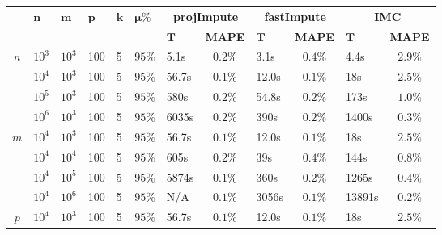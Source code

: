 \documentclass[twoside,11pt]{article}
\begin{document}
\begin{table}[ht!]
\centering
\begin{tabular}{|c|l|l|l|l|l||l|c|l|c|l|c|}
	\hline \multirow{2}{*}{} & \multirow{2}{*}{$\bm{n}$}&\multirow{2}{*}{$\bm{m}$}&\multirow{2}{*}{$\bm{p}$}&\multirow{2}{*}{$\bm{k}$} & \multirow{2}{*}{$\bm{\mu\%}$} & \multicolumn{2}{c|}{\textbf{projImpute}} & \multicolumn{2}{c|}{\textbf{fastImpute}} & \multicolumn{2}{c|}{\textbf{IMC}}\\\cline{7-12}
	&  &  & & & & $\bm{T}$ & \textbf{MAPE} & $\bm{T}$ & \textbf{MAPE}& $\bm{T}$ & \textbf{MAPE}\\\hline
	\multirow{4}{*}{$n$}&$10^3$ & $10^3$ & 100& 5 & $95\%$ & 5.1s &$0.2\%$& 3.1s &$0.4\%$ &4.4s & $2.9\%$ \\
	&$10^4$ & $10^3$& 100& 5 & $95\%$ & 56.7s&$0.1\%$& 12.0s&$0.1\%$ & 18s&$2.5\%$ \\
	&$10^5$ & $10^3$& 100 & 5 & $95\%$ & 580s &$0.2\%$& 54.8s &$0.2\%$ &173s & $1.0\%$\\
	&$10^6$ & $10^3$& 100 & 5 & $95\%$& 6035s &$0.2\%$ & 390s &$0.2\%$ &1400s & $0.3\%$  \\\hline\hline
	\multirow{4}{*}{$m$}	&$10^4$ & $10^3$& 100& 5 & $95\%$ & 56.7s&$0.1\%$& 12.0s&$0.1\%$ & 18s&$2.5\%$ \\

	&$10^4$ & $10^4$& 100& 5 & $95\%$ & 605s&$0.2\%$& 39s&$0.4\%$ & 144s &$0.8\%$ \\
	&$10^4$ & $10^5$& 100 & 5 & $95\%$ & 5874s &$0.1\%$& 360s &$0.2\%$ & 1265s & $0.4\%$  \\
	&$10^4$ & $10^6$& 100 & 5 & $95\%$ & N/A &$0.1\%$& 3056s &$0.1\%$ & 13891s & $0.2\%$  \\\hline\hline
	\multirow{4}{*}{$p$}	&$10^4$ & $10^3$& 100& 5 & $95\%$ & 56.7s&$0.1\%$& 12.0s&$0.1\%$ & 18s&$2.5\%$ \\


\end{tabular}
\end{table}
\end{document}
